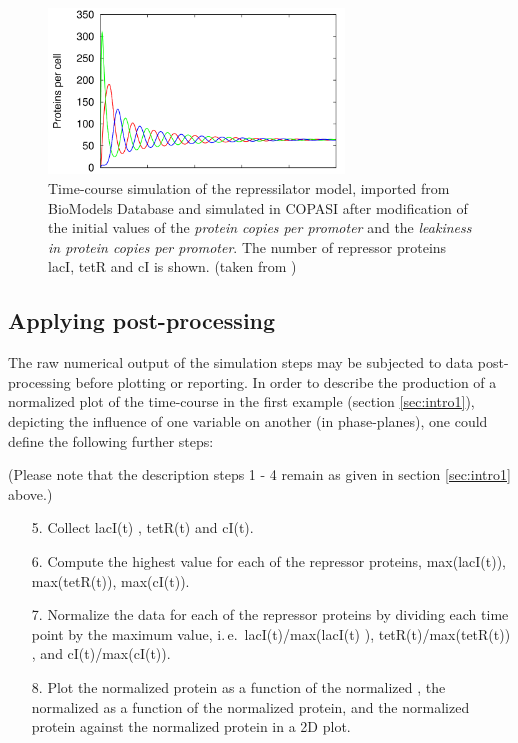 \begin{figure}
\centering
\includegraphics[width=0.7\textwidth]{images/simEx3.png}
\caption{Time-course simulation of the repressilator model, imported from BioModels Database and simulated in COPASI after modification of the initial values of the \emph{protein copies per promoter} and the \emph{leakiness in protein copies per promoter}. The number of repressor proteins lacI, tetR and cI is shown. (taken from \cite{Waltemath:2011})}
\label{fig:simEx3}
\end{figure}

\subsection{Applying post-processing}
The raw numerical output of the simulation steps may be subjected to data post-processing before plotting or reporting.  In order to describe the production of a normalized plot of the time-course in the first example (section \ref{sec:intro1}), depicting the influence of one variable on another (in phase-planes), one could define the following further steps:

(Please note that the description steps 1 - 4 remain as given in section \ref{sec:intro1} above.)
\begin{enumerate}
\item[5.]{Collect lacI(t) , tetR(t) and cI(t).}
\item[6.]{Compute the highest value for each of the repressor proteins,  max(lacI(t)), max(tetR(t)), max(cI(t)).}
\item[7.]{Normalize the data for each of the repressor proteins by dividing each time point by the maximum value, i.\,e.\ lacI(t)/max(lacI(t) ), tetR(t)/max(tetR(t)) , and cI(t)/max(cI(t)).}
\item[8.]{Plot the normalized  protein as a function of the normalized , the normalized   as a function of the normalized  protein, and the normalized  protein against the normalized  protein in a 2D plot.}
\end{enumerate}

